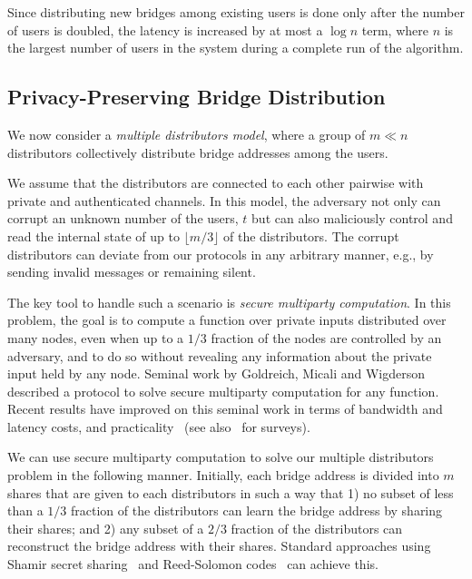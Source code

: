 \documentclass[letterpaper,twocolumn,10pt]{article}
\newcommand{\eg}{e.g.}
\begin{document}



Since distributing new bridges among existing users is done only after the number of users is doubled, the latency is increased by at most a $\log{n}$ term, where $n$ is the largest number of users in the system during a complete run of the algorithm.

\subsection{Privacy-Preserving Bridge Distribution} \label{sec:multi-dist}
We now consider a \emph{multiple distributors model}, where a group of \mbox{$m \ll n$} distributors collectively distribute bridge addresses among the users. 

We assume that the distributors are connected to each other pairwise with private and authenticated channels.
In this model, the adversary not only can corrupt an unknown number of the users, $t$ but can also maliciously control and read the internal state of up to $\lfloor m/3 \rfloor$ of the distributors. The corrupt distributors can deviate from our protocols in any arbitrary manner, \eg, by sending invalid messages or remaining silent. 

The key tool to handle such a scenario is \emph{secure multiparty computation}.  In this problem, the goal is to compute a function over private inputs distributed over many nodes, even when up to a $1/3$ fraction of the nodes are controlled by an adversary, and to do so without revealing any information about the private input held by any node.  Seminal work by Goldreich, Micali and Wigderson~\cite{Goldreich:1987:PAM:28395.28420} described a protocol to solve secure multiparty computation for any function. Recent results have improved on this seminal work in terms of bandwidth and latency costs, and practicality~\cite{boyle2015large, DKMS-ICDCN-2014, bogetoft2009secure} (see also~\cite{lindell2009secure,saia2015recent} for surveys). 

We can use secure multiparty computation to solve our multiple distributors problem in the following manner.  Initially, each bridge address is divided into $m$ shares that are given to each distributors in such a way that 1) no subset of less than a $1/3$ fraction of the distributors can learn the bridge address by sharing their shares; and 2) any subset of a $2/3$ fraction of the distributors can reconstruct the bridge address with their shares.  Standard approaches using Shamir secret sharing~\cite{shamir:how} and Reed-Solomon codes~\cite{Reed-Solomon1960} can achieve this.  
\end{document}
